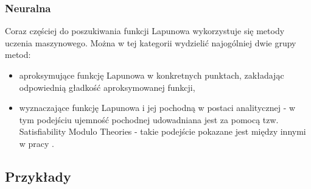 \documentclass{article}
\begin{document}
        \subsubsection{Neuralna}
        Coraz częściej do poszukiwania funkcji Lapunowa wykorzystuje się metody uczenia maszynowego.
        Można w tej kategorii wydzielić najogólniej dwie grupy metod:
        \begin{itemize}
            \item aproksymujące funkcję Lapunowa w konkretnych punktach, zakładając odpowiednią gładkość aproksymowanej funkcji,
            \item wyznaczające funkcję Lapunowa i jej pochodną w postaci analitycznej - w tym podejściu ujemność pochodnej udowadniana jest za pomocą tzw. Satisfiability Modulo Theories - takie podejście pokazane jest między innymi w pracy \cite{Chang2019}. 
        \end{itemize}        

    \subsection{Przykłady}
\end{document}
